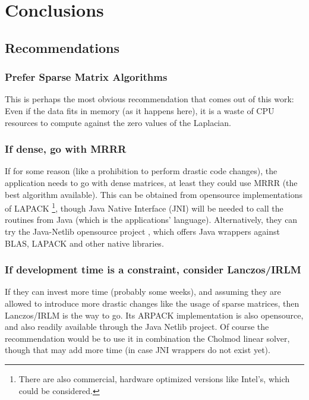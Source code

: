 \chapter{Conclusions}
\label{cha:conclu}

\section{Recommendations}

\subsection{Prefer Sparse Matrix Algorithms}

This is perhaps the most obvious recommendation that comes out of this
work: Even if the data fits in memory (as it happens here), it is a waste
of CPU resources to compute against the zero values of the \gls{Laplacian}.

\subsection{If dense, go with \gls{MRRR}}

If for some reason (like a prohibition to perform drastic code
changes), the application needs to go with dense matrices, at least
they could use \gls{MRRR} (the best algorithm available). This can
be obtained from opensource implementations of LAPACK \footnote{There
  are also commercial, hardware optimized versions like Intel's, which
  could be considered.}, though Java
Native Interface (JNI) will be needed to call the routines from Java (which
is the applications' language). Alternatively, they can try the
Java-Netlib opensource project \cite{jnetlib}, which offers Java
wrappers against BLAS, LAPACK and other native libraries.

\subsection{If development time is a constraint, consider Lanczos/\gls{IRLM}}

If they can invest more time (probably some weeks), and assuming
they are allowed to introduce more drastic changes like the usage of
sparse matrices, then Lanczos/\gls{IRLM} is the way to go. Its ARPACK
implementation is also opensource, and also readily available through
the Java Netlib project. Of course the recommendation would be to use
it in combination
the \gls{Cholmod} linear solver, though that may add more time (in case JNI
wrappers do not exist yet).

